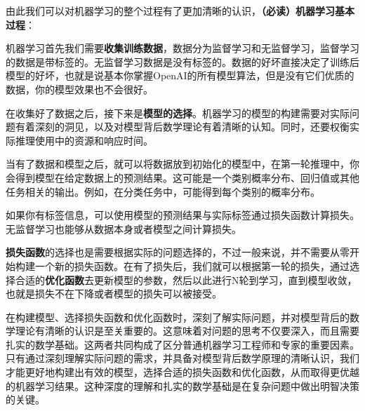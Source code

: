 由此我们可以对机器学习的整个过程有了更加清晰的认识，\textbf{（必读）机器学习基本过程}：

机器学习首先我们需要\textbf{收集训练数据}，数据分为监督学习和无监督学习，监督学习的数据是带标签的。无监督学习数据是没有标签的。数据的好坏直接决定了训练后模型的好坏，也就是说基本你掌握OpenAI的所有模型算法，但是没有它们优质的数据，你的模型效果也不会很好。

在收集好了数据之后，接下来是\textbf{模型的选择}。机器学习的模型的构建需要对实际问题有着深刻的洞见，以及对模型背后数学理论有着清晰的认知。同时，还要权衡实际推理使用中的资源和响应时间。

当有了数据和模型之后，就可以将数据放到初始化的模型中，在第一轮推理中，你会得到模型在给定数据上的预测结果。这可能是一个类别概率分布、回归值或其他任务相关的输出。例如，在分类任务中，可能得到每个类别的概率分布。

如果你有标签信息，可以使用模型的预测结果与实际标签通过损失函数计算损失。无监督学习也能够从数据本身或者模型之间计算损失。

\textbf{损失函数}的选择也是需要根据实际的问题选择的，不过一般来说，并不需要从零开始构建一个新的损失函数。在有了损失后，我们就可以根据第一轮的损失，通过选择合适的\textbf{优化函数}去更新模型的参数，然后以此进行N轮到学习，直到模型收敛，也就是损失不在下降或者模型的损失可以被接受。

在构建模型、选择损失函数和优化函数时，深刻了解实际问题，并对模型背后的数学理论有清晰的认识是至关重要的。这意味着对问题的思考不仅要深入，而且需要扎实的数学基础。这两者共同构成了区分普通机器学习工程师和专家的重要因素。只有通过深刻理解实际问题的需求，并具备对模型背后数学原理的清晰认识，我们才能更好地构建出有效的模型，选择合适的损失函数和优化函数，从而取得更优越的机器学习结果。这种深度的理解和扎实的数学基础是在复杂问题中做出明智决策的关键。
